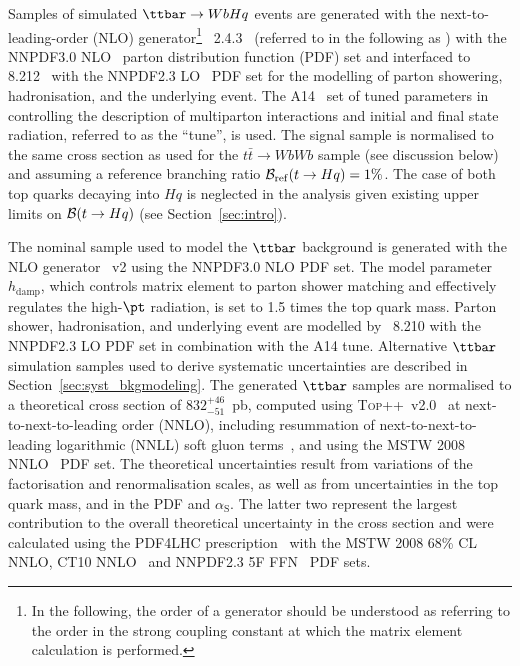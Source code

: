 Samples of simulated $\ttbar \to WbHq$ events are generated with the next-to-leading-order (NLO) generator\footnote{In the following, 
the order of a generator should be understood as referring to the order in the strong coupling constant at which the matrix element calculation 
is performed.} {\amcatnlolong}~2.4.3~\cite{Alwall:2014hca}  (referred to in the following as {\amcatnlo}) with the NNPDF3.0 NLO~\cite{Ball:2014uwa} parton distribution function (PDF) set and interfaced to {\pythia} 8.212~\cite{Sjostrand:2007gs} with the NNPDF2.3 LO~\cite{Ball:2012cx} PDF set for the modelling of parton showering, hadronisation, and the underlying event. 
The A14~\cite{ATLASUETune4} set of tuned parameters in {\pythia} controlling the description of multiparton interactions and  
initial and final state radiation, referred to as the ``tune'', is used.
The signal sample is normalised to the same cross section as used for the $t\bar{t}\to WbWb$ sample (see discussion below) and
assuming a reference branching ratio $\mathcal{B}_{\mathrm{ref}}(t\to Hq)=1\%$.
The case of both top quarks decaying into $Hq$ is neglected in the analysis given existing upper limits on $\mathcal{B}(t \to Hq)$ (see Section~\ref{sec:intro}).

The nominal sample used to model the $\ttbar$ background is generated with the NLO generator {\powheg}~v2 \cite{Frixione:2007nw,Nason:2004rx,Frixione:2007vw,Alioli:2010xd} using the NNPDF3.0 NLO PDF set. The {\powheg} model parameter $h_{\textrm{damp}}$, which controls 
matrix element to parton shower matching and effectively regulates the high-$\pt$ radiation, is set to 1.5 times the top quark mass. 
Parton shower, hadronisation, and underlying event are modelled by {\pythia}~8.210 with the NNPDF2.3 LO PDF set in combination with the A14 tune.
Alternative $\ttbar$ simulation samples used to derive systematic uncertainties are described in Section~\ref{sec:syst_bkgmodeling}. 
The generated $\ttbar$ samples are normalised to a theoretical cross section of $832^{+46}_{-51}$~pb, 
computed using \textsc{Top++}~v2.0~\cite{Czakon:2011xx} at next-to-next-to-leading order (NNLO), 
including resummation of next-to-next-to-leading logarithmic (NNLL) soft gluon 
terms~\cite{Cacciari:2011hy,Baernreuther:2012ws,Czakon:2012zr,Czakon:2012pz,Czakon:2013goa}, 
and using the MSTW 2008 NNLO~\cite{Martin:2009iq,Martin:2009bu} PDF set. 
The theoretical uncertainties result from variations of the factorisation and renormalisation scales, as well as from uncertainties in the
top quark mass, and in the PDF and $\alpha_{\textrm{S}}$. The latter two represent the largest contribution to the overall theoretical uncertainty 
in the cross section and were calculated using the PDF4LHC prescription~\cite{Botje:2011sn} 
with the MSTW 2008 68\% CL NNLO, CT10 NNLO~\cite{Lai:2010vv,Gao:2013xoa} and NNPDF2.3 5F FFN~\cite{Ball:2012cx} PDF sets.

